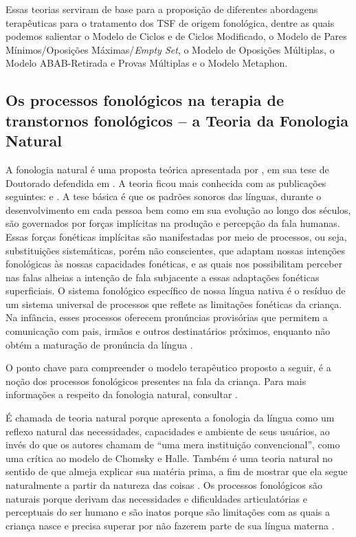 \documentclass[output=paper,colorlinks,citecolor=brown,booklanguage=portuguese]{langscibook}
\begin{document}
Essas teorias serviram de base para a proposição de diferentes abordagens terapêuticas para o tratamento dos TSF de origem fonológica, dentre as quais podemos salientar o Modelo de Ciclos e de Ciclos Modificado, o Modelo de Pares Mínimos/Oposições Máximas/\emph{Empty Set}, o Modelo de Oposições Múltiplas, o Modelo ABAB-Retirada e Provas Múltiplas e o Modelo Metaphon.

\subsection{Os processos fonológicos na terapia de transtornos fonológicos -- a Teoria da Fonologia Natural}\label{sec:cap5sec2ponto1}
\largerpage

A fonologia natural é uma proposta teórica apresentada por \citeauthor{Stampe1973}, em sua tese de Doutorado defendida em \citeyear{Stampe1973}. A teoria ficou mais conhecida com as publicações seguintes: \citet{Stampe1979a} e \citet{Stampe1979}. A tese básica é que os padrões sonoros das línguas, durante o desenvolvimento em cada pessoa bem como em sua evolução ao longo dos séculos, são governados por forças implícitas na produção e percepção da fala humanas. Essas forças fonéticas implícitas são manifestadas por meio de processos, ou seja, substituições sistemáticas, porém não conscientes, que adaptam nossas intenções fonológicas às nossas capacidades fonéticas, e as quais nos possibilitam perceber nas falas alheias a intenção de fala subjacente a essas adaptações fonéticas superficiais. O sistema fonológico específico de nossa língua nativa é o resíduo de um sistema universal de processos que reflete as limitações fonéticas da criança. Na infância, esses processos oferecem pronúncias provisórias que permitem a comunicação com pais, irmãos e outros destinatários próximos, enquanto não obtém a maturação de pronúncia da língua \citep{Stampe1979}.

O ponto chave para compreender o modelo terapêutico proposto a seguir, é a noção dos processos fonológicos presentes na fala da criança. Para mais informações a respeito da fonologia natural, consultar .

É chamada de teoria natural porque apresenta a fonologia da língua como um reflexo natural das necessidades, capacidades e ambiente de seus usuários, ao invés do que os autores chamam de “uma mera instituição convencional”, como uma crítica ao modelo de Chomsky e Halle. Também é uma teoria natural no sentido de que almeja explicar sua matéria prima, a fim de mostrar que ela segue naturalmente a partir da natureza das coisas \citep{Stampe1979}. Os processos fonológicos são naturais porque derivam das necessidades e dificuldades articulatórias e perceptuais do ser humano e são inatos porque são limitações com as quais a criança nasce e precisa superar por não fazerem parte de sua língua materna \citep{Yavas2001}.
\end{document}
